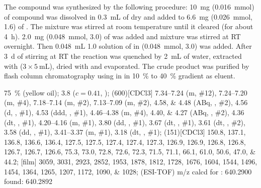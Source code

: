 The compound was synthesized by the following procedure:
\SI{10}{\milli\gram} (\SI{0.016}{\milli\mol}) of compound  was dissolved in \SI{0.3}{\milli\liter} of dry  and added to \SI{6.6}{\milli\gram} (\SI{0.026}{\milli\mol}, \SI{1.6}{\equiv}) of .
The mixture was stirred at room temperature until it cleared (for about \SI{4}{\hour}).
\SI{2.0}{\milli\gram} (\SI{0.048}{\milli\mol}, \SI{3.0}{\equiv}) of  was added and mixture was stirred at RT overnight.
Then \SI{0.048}{\milli\liter} \SI{1.0}{\Molar} solution of  in  (\SI{0.048}{\milli\mol}, \SI{3.0}{\equiv}) was added.
After \SI{3}{\day} of stirring at RT the reaction was quenched by \SI{2}{\milli\liter} of water, extracted with  ($3 \times \SI{5}{\milli\liter}$), dried with  and evaporated.
The crude product was purified by flash column chromatography using  in  in \SI{10}{\percent} to \SI{40}{\percent} gradient as eluent.
\begin{fullexp}
	 \SI{75}{\percent} (yellow oil); 
	\data{[$\alpha^{23}_D$]~$=$} \num{3.8} ($c = 0.41$, ); 
	\NMR(600)[CDCl3] \numrange{7.34}{7.24} (m, \#{12}), \numrange{7.24}{7.20} (m, \#{4}), \numrange{7.18}{7.14} (m, \#{2}), \numrange{7.13}{7.09} (m, \#{2}), \numlist{4.58;4.48} (ABq, , \#{2}), \num{4.56} (d, , \#{1}), \num{4.53} (ddd, , \#{1}), \numrange{4.46}{4.38} (m, \#{4}), \numlist{4.40;4.27} (ABq, , \#{2}), \num{4.36} (dt, , \#{1}), \numrange{4.20}{4.16} (m, \#{1}), \num{3.80} (dd, , \#{1}), \num{3.67} (dt, , \#{1}), \num{3.61} (dt, , \#{2}), \num{3.58} (dd, , \#{1}), \numrange{3.41}{3.37} (m, \#{1}), \num{3.18} (dt, , \#{1}); 
	(151)[CDCl3] \numlist{150.8; 137.1; 136.8; 136.6; 136.4; 127.5; 127.5; 127.4; 127.4; 127.3; 126.9; 126.9; 126.8; 126.8; 126.7; 126.7; 126.6; 75.3; 73.0; 72.8; 72.6; 72.3; 71.5; 71.1; 66.1; 61.0; 50.6; 47.0; 44.2}; 
	[film] \numlist{3059; 3031; 2923; 2852; 1953; 1878; 1812; 1728; 1676; 1604; 1544; 1496; 1454; 1364; 1265; 1207; 1172; 1090; 1028}; 
	 (ESI-TOF) m/z calcd for : \num{640.2900} found: \num{640.2892}
\end{fullexp}

